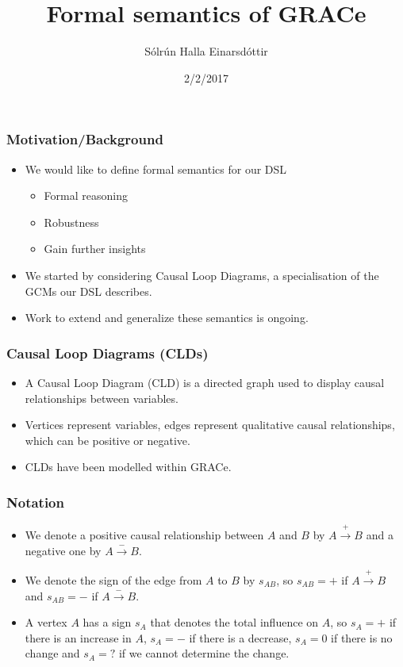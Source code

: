 \documentclass{beamer}
\title{Formal semantics of GRACe}
\author{Sólrún Halla Einarsdóttir}
\institute{Chalmers University of Technology}
\date{2/2/2017}
\begin{document}
\begin{frame}
\titlepage
\end{frame}
\begin{frame}
\frametitle{Motivation/Background}
\begin{itemize}
  \item We would like to define formal semantics for our DSL
  \begin{itemize}
    \item Formal reasoning
    \item Robustness
    \item Gain further insights
  \end{itemize}

  \item We started by considering Causal Loop Diagrams, a specialisation of
the GCMs our DSL describes.

\item Work to extend and generalize these semantics is ongoing.

\end{itemize}
\end{frame}

\begin{frame}
\frametitle{Causal Loop Diagrams (CLDs)}
\begin{itemize}
\item A Causal Loop Diagram (CLD) is a directed graph used to display causal
relationships between variables.
%
\item Vertices represent variables, edges represent
qualitative causal relationships, which can be positive or negative.

\item CLDs have been modelled within GRACe.
\end{itemize}
\end{frame}
\begin{frame}
\frametitle{Notation}
\begin{itemize}
\item We denote a positive causal relationship between $A$ and $B$ by
$A\xrightarrow{+} B$ and a negative one by $A \xrightarrow{-} B$.
%
\item We denote the sign of the edge from $A$ to $B$ by $s_{AB}$, so
$s_{AB}= +$ if $A\xrightarrow{+} B$ and $s_{AB}=-$ if
$A\xrightarrow{-} B$.

\item A vertex $A$ has a sign $s_A$ that denotes the total influence on
$A$, so $s_A=+$ if there is an increase in $A$, $s_A=-$ if there is a
decrease, $s_A=0$ if there is no change and $s_A=?$ if we cannot
determine the change.
\end{itemize}
\end{frame}
\end{document}
